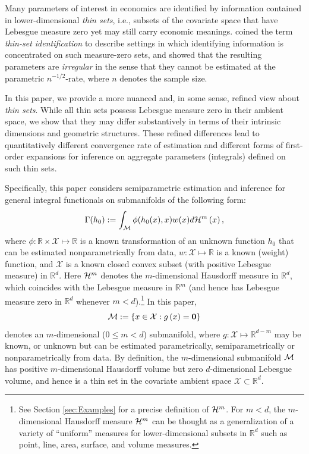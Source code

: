 \documentclass[12pt,american]{article}
\theoremstyle{definition}
\theoremstyle{plain}
\theoremstyle{definition}
\theoremstyle{plain}
\theoremstyle{plain}
\theoremstyle{plain}
\theoremstyle{plain}
\theoremstyle{plain}
\newcommand{\R}{\mathbb{R}}
\begin{document}
Many parameters of interest in economics are identified by information contained in lower-dimensional \emph{thin sets}, i.e., subsets of the covariate space that have Lebesgue measure zero yet may still carry economic meanings. \citet*{khan2010irregular} coined the term \emph{thin-set identification} to describe settings in which identifying information is concentrated on such measure-zero sets, and showed that the resulting parameters are \emph{irregular} in the sense that they cannot be estimated at the parametric $n^{-1/2}$-rate, where $n$ denotes the sample size.

In this paper, we provide a more nuanced and, in some sense, refined view about \emph{thin sets}. While all thin sets possess Lebesgue measure zero in their ambient space, we show that they may differ substantively in terms of their intrinsic dimensions and geometric structures. These refined differences lead to quantitatively different convergence rate of estimation and different forms of first-order expansions for inference on aggregate parameters (integrals) defined on such thin sets.

Specifically, this paper considers semiparametric estimation and inference for general integral functionals on submanifolds of the following form:
\begin{equation}
  \Gamma(h_0):=\int_{{\cal M}}\phi(h_{0}(x),x)w(x)d{\cal H}^{m}\left(x\right),\label{eq:SM_nonlinear}
\end{equation}
where $\phi:\R \times \mathcal{X} \mapsto \R$ is a known transformation of an unknown function $h_0$ that can be estimated nonparametrically from data, $w:\mathcal{X} \mapsto \R$ is a known (weight) function, and $\mathcal{X}$ is a known closed convex subset (with positive Lebesgue measure) in $\R^d$. Here ${\cal H}^{m}$
denotes the $m$-dimensional Hausdorff measure in $\R^{d}$, which coincides with the Lebesgue measure in $\R^m$ (and hence has Lebesgue measure zero in $\R^d$ whenever $m<d$).\footnote{See Section \ref{sec:Examples} for a precise definition of ${\cal H}^{m}$. For $m<d$, the $m$-dimensional Hausdorff measure ${\cal H}^{m}$ can be thought as a generalization of a variety of ``uniform'' measures for lower-dimensional subsets in $\R^d$ such as point, line, area, surface, and volume measures.} In this paper,
\begin{equation}\label{eq:M-defn}
  {\cal M}:=\left\{ x\in{\cal X}:g\left(x\right)={\bf 0}\right\}
\end{equation}
denotes an $m$-dimensional ($0\leq m <d$) submanifold, where $g:\mathcal{X} \mapsto \R^{d-m}$ may be known, or unknown but can be estimated parametrically, semiparametrically or nonparametrically from data. By definition,
the $m$-dimensional submanifold ${\cal M}$ has positive $m$-dimensional Hausdorff volume but zero $d$-dimensional Lebesgue volume, and hence is a thin set in the covariate ambient space $\mathcal{X}\subset \R^{d}$.
\end{document}
